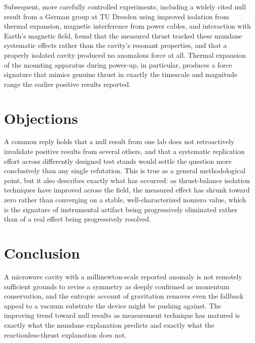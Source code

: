 \documentclass[11pt]{article}
\begin{document}
Subsequent, more carefully controlled experiments, including a widely cited null result from a German group at TU Dresden using improved isolation from thermal expansion, magnetic interference from power cables, and interaction with Earth's magnetic field, found that the measured thrust tracked these mundane systematic effects rather than the cavity's resonant properties, and that a properly isolated cavity produced no anomalous force at all. Thermal expansion of the mounting apparatus during power-up, in particular, produces a force signature that mimics genuine thrust in exactly the timescale and magnitude range the earlier positive results reported.

\section{Objections}

A common reply holds that a null result from one lab does not retroactively invalidate positive results from several others, and that a systematic replication effort across differently designed test stands would settle the question more conclusively than any single refutation. This is true as a general methodological point, but it also describes exactly what has occurred: as thrust-balance isolation techniques have improved across the field, the measured effect has shrunk toward zero rather than converging on a stable, well-characterized nonzero value, which is the signature of instrumental artifact being progressively eliminated rather than of a real effect being progressively resolved.

\section{Conclusion}

A microwave cavity with a millinewton-scale reported anomaly is not remotely sufficient grounds to revise a symmetry as deeply confirmed as momentum conservation, and the entropic account of gravitation removes even the fallback appeal to a vacuum substrate the device might be pushing against. The improving trend toward null results as measurement technique has matured is exactly what the mundane explanation predicts and exactly what the reactionless-thrust explanation does not.
\end{document}
